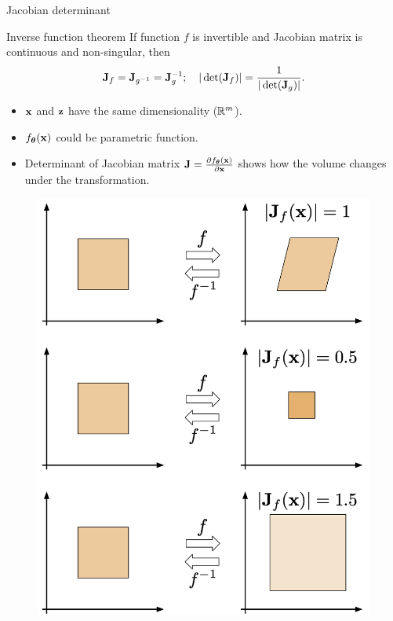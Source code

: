 \begin{frame}{Jacobian determinant}
	\begin{block}{Inverse function theorem}
		If function $f$ is invertible and Jacobian matrix is continuous and non-singular, then
		\vspace{-0.3cm}
		\[
		\mathbf{J}_f = \mathbf{J}_{g^{-1}} = \mathbf{J}_g^{-1}; \quad |\det (\mathbf{J}_f)| = \frac{1}{|\det (\mathbf{J}_g)|}.
		\]
		\vspace{-0.3cm}
	\end{block}
	\begin{minipage}{0.55\columnwidth}
		\begin{itemize}
			\item $\mathbf{x}$ and $\mathbf{z}$ have the same dimensionality ($\mathbb{R}^m$).
			\vfill
			\item $f_{\boldsymbol{\theta}}(\mathbf{x})$ could be parametric function.
			\vfill
			\item Determinant  of Jacobian matrix $\mathbf{J} =\frac{\partial f_{\boldsymbol{\theta}}(\mathbf{x})}{\partial \mathbf{x}}$ shows how the volume changes under the transformation.
		\end{itemize}
	\end{minipage}%
	\begin{minipage}{0.45\columnwidth}
		\begin{figure}
			\includegraphics[width=0.8\linewidth]{figs/jacobian_det}
		\end{figure}
	\end{minipage}
\end{frame}
